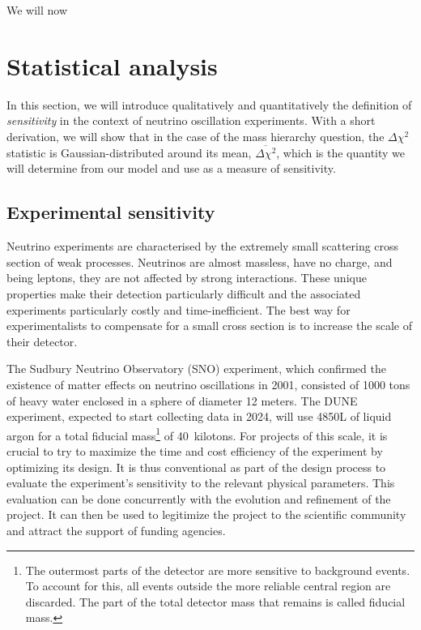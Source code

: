 \label{ch:methods}
We will now

\section{Statistical analysis}\label{sec:statistics}
In this section, we will introduce qualitatively and quantitatively the definition of
\emph{sensitivity} in the context of neutrino oscillation experiments. With a
short derivation, we will show that in the case of the mass hierarchy question,
the $\Delta \chi^2$ statistic is Gaussian-distributed around its mean,
$\overline{\Delta \chi^2}$, which is the quantity we will determine from our
model and use as a measure of sensitivity.

\subsection{Experimental sensitivity}
Neutrino experiments are characterised by the extremely small scattering cross
section of weak processes. Neutrinos are almost massless, have no charge, and
being leptons, they are not affected by strong interactions. These unique
properties make their detection particularly difficult and the associated
experiments particularly costly and time-inefficient. The best way for
experimentalists to compensate for a small cross section is to increase the scale
of their detector. 

The Sudbury Neutrino Observatory (SNO) experiment, which confirmed
the existence of matter effects on neutrino oscillations in 2001, consisted of 1000
tons of heavy water enclosed in a sphere of diameter 12 meters\cite{thomson}.
The DUNE experiment, expected to start collecting data in 2024, will use 4850L
of liquid argon for a total fiducial mass\footnote{The outermost parts of the
detector are more sensitive to background events. To account for this, all
events outside the more reliable central region are discarded. The part of the
total detector mass that remains is called fiducial mass.} of 40~kilotons\cite{cdr}.
For projects of this scale, it is crucial to try to maximize the time and cost
efficiency of the experiment by optimizing its design. It is thus conventional as part of
the design process to evaluate the experiment's sensitivity to the relevant
physical parameters. This evaluation can be done concurrently with the
evolution and refinement of the project. It can then be used to legitimize
the project to the scientific community and attract the support of funding
agencies.

